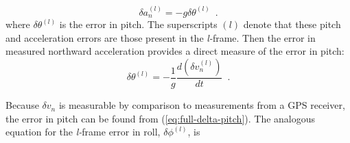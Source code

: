 \documentclass[12pt,twoside,english,12pt,twoside,english]{article}\usepackage[]{graphicx}\usepackage[]{color}
\let\OrgIndex\index
\renewcommand*{\index}[1]{\OrgIndex{#1}}
\begin{document}
\begin{equation}
\delta a_{n}^{(l)}=-g\delta\theta^{(l)}\,\,\,.\label{eq:delta-an}
\end{equation}
where
$\delta\theta^{(l)}$ is the error
in pitch. The superscripts $(l)$ denote that these pitch and acceleration
errors are those present
in the 
\emph{l-}frame. Then the error in measured northward
acceleration provides a direct measure of the error in pitch:\\
\begin{equation}
\delta\theta^{(l)}=-\frac{1}{g}\frac{d(\delta v_{n}^{(l)})}{dt}\,\,\,.\label{eq:full-delta-pitch}
\end{equation}

Because $\delta v_{n}$ is measurable by comparison
to measurements from a GPS
receiver, the error in
pitch can be found from (\ref{eq:full-delta-pitch}). The analogous
equation for the \emph{l-}frame error
in roll, $\delta\phi^{(l)}$, is
\end{document}
